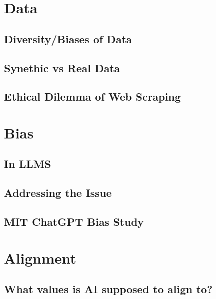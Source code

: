 \documentclass[
]{book}
\begin{document}
\hypertarget{data}{%
\chapter{Data}\label{data}}

\hypertarget{diversitybiases-of-data}{%
\section{Diversity/Biases of Data}\label{diversitybiases-of-data}}

\hypertarget{synethic-vs-real-data}{%
\section{Synethic vs Real Data}\label{synethic-vs-real-data}}

\hypertarget{ethical-dilemma-of-web-scraping}{%
\section{Ethical Dilemma of Web Scraping}\label{ethical-dilemma-of-web-scraping}}

\hypertarget{bias}{%
\chapter{Bias}\label{bias}}

\hypertarget{in-llms}{%
\section{In LLMS}\label{in-llms}}

\hypertarget{addressing-the-issue}{%
\section{Addressing the Issue}\label{addressing-the-issue}}

\hypertarget{mit-chatgpt-bias-study}{%
\section{MIT ChatGPT Bias Study}\label{mit-chatgpt-bias-study}}

\hypertarget{alignment}{%
\chapter{Alignment}\label{alignment}}

\hypertarget{what-values-is-ai-supposed-to-align-to}{%
\section{What values is AI supposed to align to?}\label{what-values-is-ai-supposed-to-align-to}}
\end{document}
